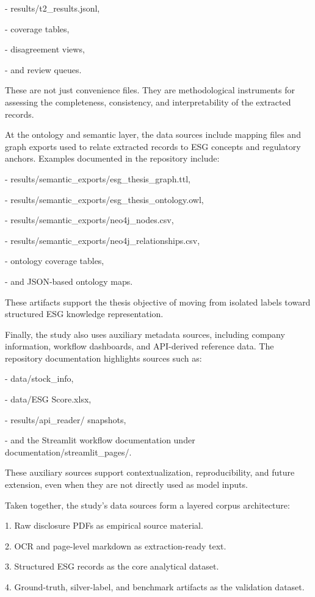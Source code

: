 \documentclass{article}
\begin{document}
- results/t2\_results.jsonl,

- coverage tables,

- disagreement views,

- and review queues.

These are not just convenience files. They are methodological instruments for assessing the completeness, consistency, and interpretability of the extracted records.

At the ontology and semantic layer, the data sources include mapping files and graph exports used to relate extracted records to ESG concepts and regulatory anchors. Examples documented in the repository include:

- results/semantic\_exports/esg\_thesis\_graph.ttl,

- results/semantic\_exports/esg\_thesis\_ontology.owl,

- results/semantic\_exports/neo4j\_nodes.csv,

- results/semantic\_exports/neo4j\_relationships.csv,

- ontology coverage tables,

- and JSON-based ontology maps.

These artifacts support the thesis objective of moving from isolated labels toward structured ESG knowledge representation.

Finally, the study also uses auxiliary metadata sources, including company information, workflow dashboards, and API-derived reference data. The repository documentation highlights sources such as:

- data/stock\_info,

- data/ESG Score.xlsx,

- results/api\_reader/ snapshots,

- and the Streamlit workflow documentation under documentation/streamlit\_pages/.

These auxiliary sources support contextualization, reproducibility, and future extension, even when they are not directly used as model inputs.

Taken together, the study’s data sources form a layered corpus architecture:

1. Raw disclosure PDFs as empirical source material.

2. OCR and page-level markdown as extraction-ready text.

3. Structured ESG records as the core analytical dataset.

4. Ground-truth, silver-label, and benchmark artifacts as the validation dataset.
\end{document}
